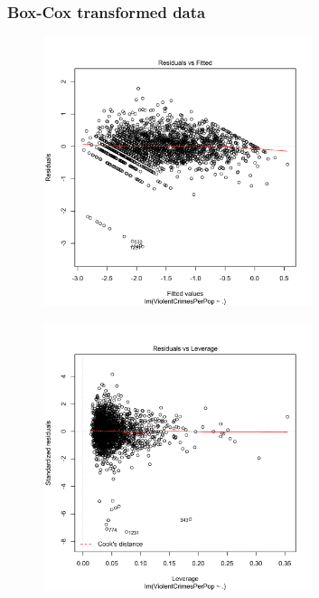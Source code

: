 \documentclass[12pt,a4paper]{article}
\begin{document}
\begin{singlespace}
\newpage
\subsubsection{Box-Cox transformed data}
\vspace{-0.5cm}
\begin{figure}[h!]
    \centering
    \includegraphics[width=0.7\textwidth,trim= 0 0 20 30, clip]{Boxcox_regression_residuals.pdf}
\end{figure}
\FloatBarrier

\vspace{-0.5cm}
\begin{figure}[h!]
    \centering
    \includegraphics[width=0.7\textwidth,trim= 0 0 20 30, clip]{Boxcox_regression_cook.pdf}
\end{figure}
\FloatBarrier


\end{singlespace}
\end{document}
